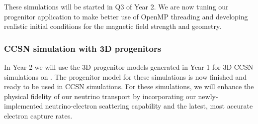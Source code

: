 \documentclass[12pt]{article}
\begin{document}
These simulations will be started in Q3 of Year 2. We are now tuning our progenitor application to make better use of OpenMP threading and developing realistic initial conditions for the magnetic field strength and geometry.

\subsubsection{CCSN simulation with 3D progenitors}

In Year 2 we will use the 3D progenitor models generated in Year 1 for 3D CCSN simulations on \thet.
The progenitor model for these simulations is now finished and ready to be used in CCSN simulations. 
For these simulations, we will enhance the physical fidelity of our neutrino transport by incorporating our newly-implemented neutrino-electron scattering capability and the latest, most accurate electron capture rates. 






\end{document}
